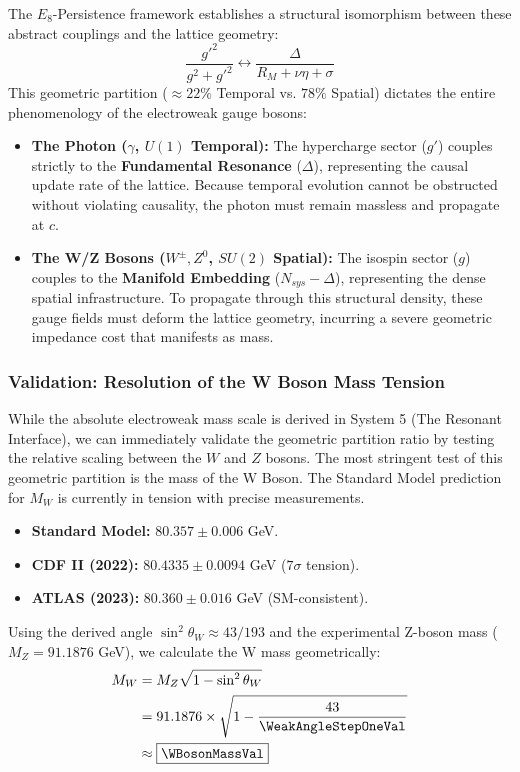 The $E_8$-Persistence framework establishes a structural isomorphism between these abstract couplings and the lattice geometry:
\begin{equation}
\frac{g'^2}{g^2 + g'^2} \longleftrightarrow \frac{\Delta}{R_M + \nu\eta + \sigma}
\end{equation}
This geometric partition ($\approx 22\%$ Temporal vs. $78\%$ Spatial) dictates the entire phenomenology of the electroweak gauge bosons:
\begin{itemize}
    \item \textbf{The Photon ($\gamma$, $U(1)$ Temporal):} The hypercharge sector ($g'$) couples strictly to the \textbf{Fundamental Resonance} ($\Delta$), representing the causal update rate of the lattice. Because temporal evolution cannot be obstructed without violating causality, the photon must remain massless and propagate at $c$.
    \item \textbf{The W/Z Bosons ($W^{\pm}, Z^0$, $SU(2)$ Spatial):} The isospin sector ($g$) couples to the \textbf{Manifold Embedding} ($N_{sys} - \Delta$), representing the dense spatial infrastructure. To propagate through this structural density, these gauge fields must deform the lattice geometry, incurring a severe geometric impedance cost that manifests as mass.
\end{itemize}

\subsubsection{Validation: Resolution of the W Boson Mass Tension}
While the absolute electroweak mass scale is derived in System 5 (The Resonant Interface), we can immediately validate the geometric partition ratio by testing the relative scaling between the $W$ and $Z$ bosons. The most stringent test of this geometric partition is the mass of the W Boson. The Standard Model prediction for $M_W$ is currently in tension with precise measurements.
\begin{itemize}
    \item \textbf{Standard Model:} $80.357 \pm 0.006$ GeV.
    \item \textbf{CDF II (2022):} $80.4335 \pm 0.0094$ GeV ($7\sigma$ tension).
    \item \textbf{ATLAS (2023):} $80.360 \pm 0.016$ GeV (SM-consistent).
\end{itemize}

Using the derived angle $\sin^2 \theta_W \approx 43/193$ and the experimental Z-boson mass ($M_Z = 91.1876$ GeV), we calculate the W mass geometrically:
\begin{equation}
\begin{split}
    M_W &= M_Z \sqrt{1 - \sin^2 \theta_W} \\
    &= 91.1876 \times \sqrt{1 - \frac{43}{\WeakAngleStepOneVal}} \\
    &\approx \boxed{\mathbf{\WBosonMassVal}}
\end{split}
\end{equation}

